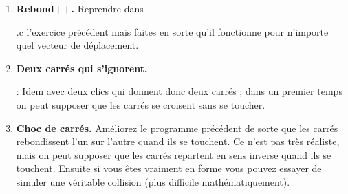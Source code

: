 \documentclass[11pt,a4paper]{article}
\newcommand{\checkbox}{$\square$ \smallskip}
\newcounter{exo} \setcounter{exo}{0}
\newenvironment{action}{%
    \begin{enumerate}[\numerotation] \addtocounter{exo}{-1}%
        }{%
    \end{enumerate}
}
\newcommand{\numexoa}{\theexo \addtocounter{exo}{1}}
\newcommand{\numerotation}{\checkbox \smallskip \numexoa.}
\newcounter{exoo} \setcounter{exoo}{0}
\newcommand{\numexo}{\theexoo}
\newcommand{\repexo}{{\tt exo_\numexo}}
\newcommand{\exoplus}{\addtocounter{exoo}{1}}
\begin{document}
\begin{action}
\item {\bf Rebond++.} Reprendre dans \exoplus \repexo.c l'exercice précédent mais faites en sorte qu'il fonctionne pour n'importe quel vecteur de déplacement.
\item {\bf Deux carrés qui s'ignorent.} \exoplus \repexo : Idem avec deux clics qui donnent donc deux carrés ; dans un premier temps on peut supposer que les carrés se croisent sans se toucher.
\item {\bf Choc de carrés.} Améliorez le programme précédent de sorte que les carrés rebondissent l'un sur l'autre quand ils se touchent. Ce n'est pas très réaliste, mais on peut supposer que les carrés repartent en sens inverse quand ils se touchent. Ensuite si vous êtes vraiment en forme vous pouvez essayer de simuler une véritable collision (plus difficile mathématiquement).
\end{action}
\end{document}
